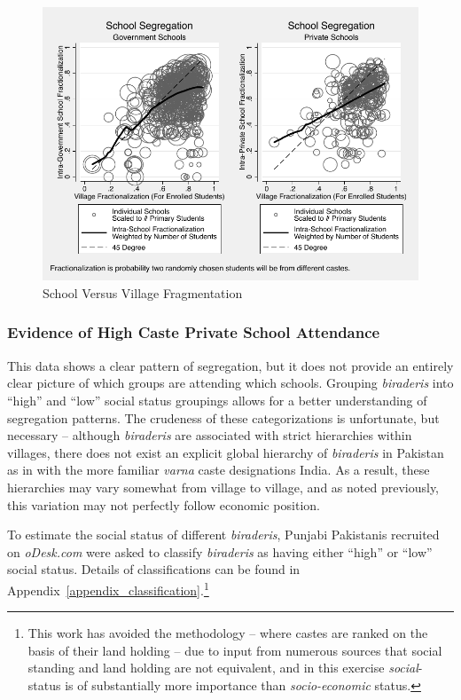 \documentclass[Eubank_pk_ethnic_sorting.tex]{subfiles}
\begin{document}
\begin{figure}[H]
	\begin{center}
	\caption{School Versus Village Fragmentation}\label{schoolvvillageherf}
	\includegraphics[scale=1.0]{../graphs/intra_versus_intervillage_frac_combined.pdf}
	\end{center}
\end{figure}



\subsubsection{Evidence of High Caste Private School Attendance}

This data shows a clear pattern of segregation, but it does not provide an entirely clear picture of which groups are attending which schools.  Grouping \emph{biraderis} into ``high'' and ``low'' social status groupings allows for a better understanding of segregation patterns. The crudeness of these categorizations is unfortunate, but necessary -- although \emph{biraderis} are associated with strict hierarchies within villages, there does not exist an explicit global hierarchy of \emph{biraderis} in Pakistan as in with the more familiar \emph{varna} caste designations India. As a result, these hierarchies may vary somewhat from village to village, and as noted previously, this variation may not perfectly follow economic position. 

To estimate the social status of different \emph{biraderis}, Punjabi Pakistanis recruited on \emph{oDesk.com} were asked to classify \emph{biraderis} as having either ``high'' or ``low'' social status. Details of classifications can be found in Appendix~\ref{appendix_classification}.\footnote{This work has avoided the \cite{Jacoby:2011tc} methodology -- where castes are ranked on the basis of their land holding -- due to input from numerous sources that social standing and land holding are not equivalent, and in this exercise \emph{social}-status is of substantially more importance than \emph{socio-economic} status.}
\end{document}
